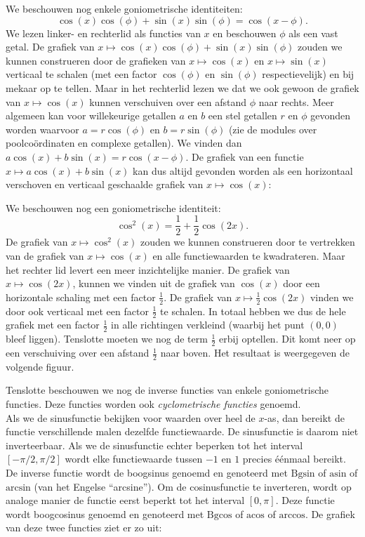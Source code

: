 We beschouwen nog enkele goniometrische identiteiten:
\[
\cos(x)\cos(\phi)+\sin(x)\sin(\phi)=\cos(x-\phi).
\]
We lezen linker- en rechterlid als functies van $x$ en
beschouwen $\phi$ als een vast getal. De grafiek van $x\mapsto
\cos(x)\cos(\phi)+\sin(x)\sin(\phi)$ zouden we kunnen construeren door
de grafieken van $x\mapsto\cos(x)$ en $x\mapsto\sin(x)$ verticaal te
schalen (met een factor $\cos(\phi)$ en $\sin(\phi)$
respectievelijk) en bij mekaar op te tellen. Maar in het rechterlid
lezen we dat we ook gewoon de grafiek van $x\mapsto\cos(x)$ kunnen
verschuiven over een afstand $\phi$ naar rechts.
Meer algemeen kan voor willekeurige getallen $a$ en $b$ een stel
getallen $r$ en $\phi$ gevonden worden waarvoor $a=r\cos(\phi)$ en
$b=r\sin(\phi)$ (zie de modules over poolco\"ordinaten en complexe
getallen). We vinden dan $a\cos(x)+b\sin(x)=r\cos(x-\phi)$. De grafiek
van een functie $x\mapsto a\cos(x)+b\sin(x)$ kan dus altijd gevonden
worden als een horizontaal verschoven en verticaal geschaalde grafiek
van $x\mapsto\cos(x)$:


\newpage

We beschouwen nog een goniometrische identiteit:
\[
\cos^2(x)=\frac{1}{2}+\frac{1}{2}\cos(2x).
\]
De grafiek van $x\mapsto\cos^2(x)$ zouden we kunnen construeren door te
vertrekken van de grafiek van $x\mapsto\cos(x)$ en alle functiewaarden te
kwadrateren. Maar het rechter lid levert een meer inzichtelijke
manier. De grafiek van $x\mapsto\cos(2x)$, kunnen we vinden uit de grafiek van
$\cos(x)$ door een horizontale schaling met een factor
$\frac{1}{2}$. De grafiek van $x\mapsto\frac{1}{2}\cos(2x)$ vinden we door ook
verticaal met een factor $\frac{1}{2}$ te schalen. In totaal hebben
we dus de hele grafiek met een factor $\frac{1}{2}$ in alle richtingen
verkleind (waarbij het punt $(0,0)$ bleef liggen). Tenslotte moeten we
nog de term $\frac{1}{2}$ erbij optellen. Dit komt neer op een
verschuiving over een afstand $\frac{1}{2}$ naar boven. Het resultaat
is weergegeven de volgende figuur.


Tenslotte beschouwen we nog de inverse functies van enkele
goniometrische functies. Deze functies worden ook {\em cyclometrische
functies} genoemd.\\
Als we de sinusfunctie bekijken voor waarden over heel de $x$-as, dan
bereikt de functie verschillende malen dezelfde functiewaarde. De
sinusfunctie is daarom niet inverteerbaar. Als we de sinusfunctie
echter beperken tot het interval $[-\pi/2,\pi/2]$ wordt elke
functiewaarde tussen $-1$ en $1$ precies \'e\'enmaal bereikt. De
inverse functie wordt de boogsinus genoemd en genoteerd met
$\mbox{Bgsin}$ of $\mbox{asin}$ of $\mbox{arcsin}$ (van het Engelse
``arcsine''). 
Om de cosinusfunctie te inverteren, wordt op analoge manier de functie
eerst beperkt tot het interval $[0,\pi]$. Deze functie wordt
boogcosinus genoemd en genoteerd met $\mbox{Bgcos}$ of $\mbox{acos}$
of $\mbox{arccos}$. De grafiek van deze twee functies ziet er zo uit:

